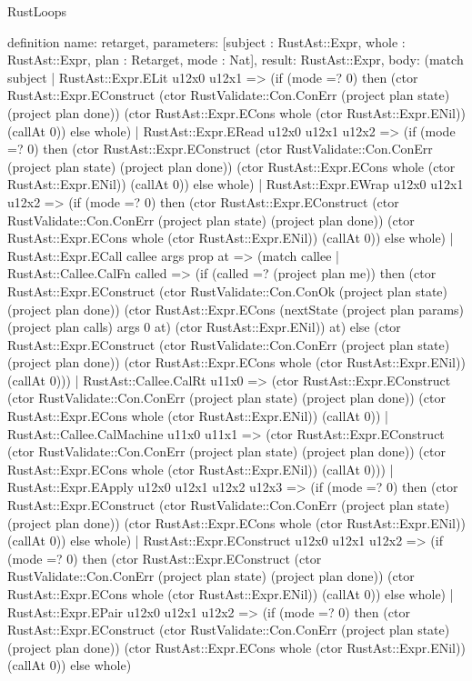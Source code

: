 \begin{lexlean}{RustLoops}
\begin{semanticmodule}
definition{
  name: retarget,
  parameters: [subject : RustAst::Expr, whole : RustAst::Expr, plan : Retarget, mode : Nat],
  result: RustAst::Expr,
  body: (match subject
    | RustAst::Expr.ELit u12x0 u12x1 => (if (mode =? 0) then (ctor RustAst::Expr.EConstruct (ctor RustValidate::Con.ConErr (project plan state) (project plan done)) (ctor RustAst::Expr.ECons whole (ctor RustAst::Expr.ENil)) (callAt 0)) else whole)
    | RustAst::Expr.ERead u12x0 u12x1 u12x2 => (if (mode =? 0) then (ctor RustAst::Expr.EConstruct (ctor RustValidate::Con.ConErr (project plan state) (project plan done)) (ctor RustAst::Expr.ECons whole (ctor RustAst::Expr.ENil)) (callAt 0)) else whole)
    | RustAst::Expr.EWrap u12x0 u12x1 u12x2 => (if (mode =? 0) then (ctor RustAst::Expr.EConstruct (ctor RustValidate::Con.ConErr (project plan state) (project plan done)) (ctor RustAst::Expr.ECons whole (ctor RustAst::Expr.ENil)) (callAt 0)) else whole)
    | RustAst::Expr.ECall callee args prop at => (match callee
      | RustAst::Callee.CalFn called => (if (called =? (project plan me)) then (ctor RustAst::Expr.EConstruct (ctor RustValidate::Con.ConOk (project plan state) (project plan done)) (ctor RustAst::Expr.ECons (nextState (project plan params) (project plan calls) args 0 at) (ctor RustAst::Expr.ENil)) at) else (ctor RustAst::Expr.EConstruct (ctor RustValidate::Con.ConErr (project plan state) (project plan done)) (ctor RustAst::Expr.ECons whole (ctor RustAst::Expr.ENil)) (callAt 0)))
      | RustAst::Callee.CalRt u11x0 => (ctor RustAst::Expr.EConstruct (ctor RustValidate::Con.ConErr (project plan state) (project plan done)) (ctor RustAst::Expr.ECons whole (ctor RustAst::Expr.ENil)) (callAt 0))
      | RustAst::Callee.CalMachine u11x0 u11x1 => (ctor RustAst::Expr.EConstruct (ctor RustValidate::Con.ConErr (project plan state) (project plan done)) (ctor RustAst::Expr.ECons whole (ctor RustAst::Expr.ENil)) (callAt 0)))
    | RustAst::Expr.EApply u12x0 u12x1 u12x2 u12x3 => (if (mode =? 0) then (ctor RustAst::Expr.EConstruct (ctor RustValidate::Con.ConErr (project plan state) (project plan done)) (ctor RustAst::Expr.ECons whole (ctor RustAst::Expr.ENil)) (callAt 0)) else whole)
    | RustAst::Expr.EConstruct u12x0 u12x1 u12x2 => (if (mode =? 0) then (ctor RustAst::Expr.EConstruct (ctor RustValidate::Con.ConErr (project plan state) (project plan done)) (ctor RustAst::Expr.ECons whole (ctor RustAst::Expr.ENil)) (callAt 0)) else whole)
    | RustAst::Expr.EPair u12x0 u12x1 u12x2 => (if (mode =? 0) then (ctor RustAst::Expr.EConstruct (ctor RustValidate::Con.ConErr (project plan state) (project plan done)) (ctor RustAst::Expr.ECons whole (ctor RustAst::Expr.ENil)) (callAt 0)) else whole)
}
\end{semanticmodule}
\end{lexlean}
